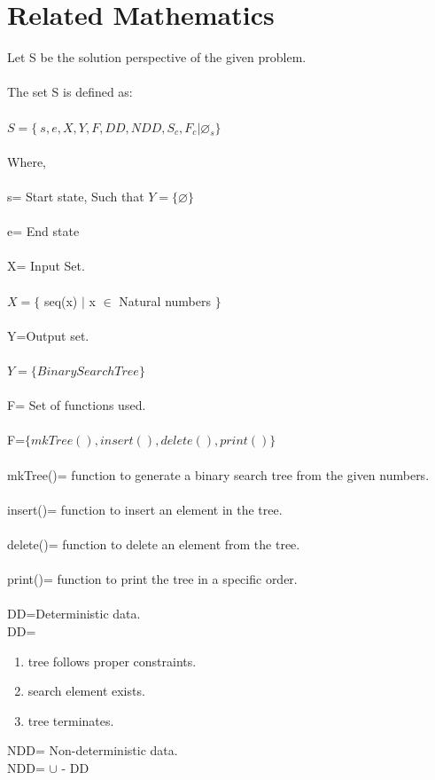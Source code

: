 \documentclass[10pt,a4paper]{article}
\begin{document}
\section{Related Mathematics}
Let S be the solution perspective of the given problem.
\\\\The set S is defined as:
\\\\$S=\lbrace\ s,e,X,Y,F,DD,NDD,S_{c},F_{c}|\varnothing_{s}\rbrace$
\\\\Where,
\\\\s= Start state,  Such that $Y=\lbrace \varnothing \rbrace$ 
\\\\e= End state 
\\\\X= Input Set.
\\\\$X=\lbrace$ seq(x) $\mid$ x $\in$ Natural numbers $\rbrace$
\\\\Y=Output set.
\\\\$Y=\lbrace Binary Search Tree \rbrace $
\\\\F= Set of functions used.
\\\\F=$\lbrace mkTree(),insert(), delete(), print() \rbrace$
\\\\mkTree()= function to generate a binary search tree from the given numbers.
\\\\insert()= function to insert an element in the tree.
\\\\delete()= function to delete an element from the tree.
\\\\print()= function to print the tree in a specific order.
\\\\DD=Deterministic data.
\\DD=
\begin{enumerate}
\item tree follows proper constraints.
\item search element exists.
\item tree terminates.
\end{enumerate}
NDD= Non-deterministic data.
\\NDD= $\cup$ - DD
\end{document}
